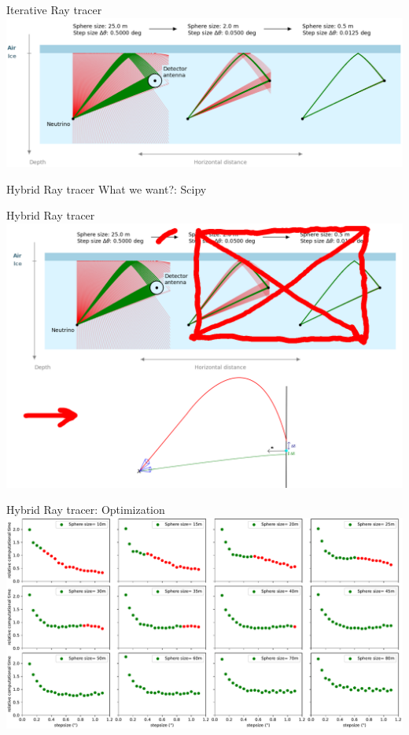 \documentclass{beamer}
\begin{document}
\begin{frame}{Iterative Ray tracer}
  \centering
  \includegraphics[width=\textwidth]{figures/iterative_explanation.png}
\end{frame}
\begin{frame}{Hybrid Ray tracer}
	What we want?: Scipy
\end{frame}
\begin{frame}{Hybrid Ray tracer}
  \centering
  \includegraphics[width=\textwidth]{figures/FullHybridIllu.png}
\end{frame}
\begin{frame}{Hybrid Ray tracer: Optimization}
  \centering
  \includegraphics[width=\textwidth]{figures/subplotallsphereandstep.pdf}
\end{frame}
\end{document}
